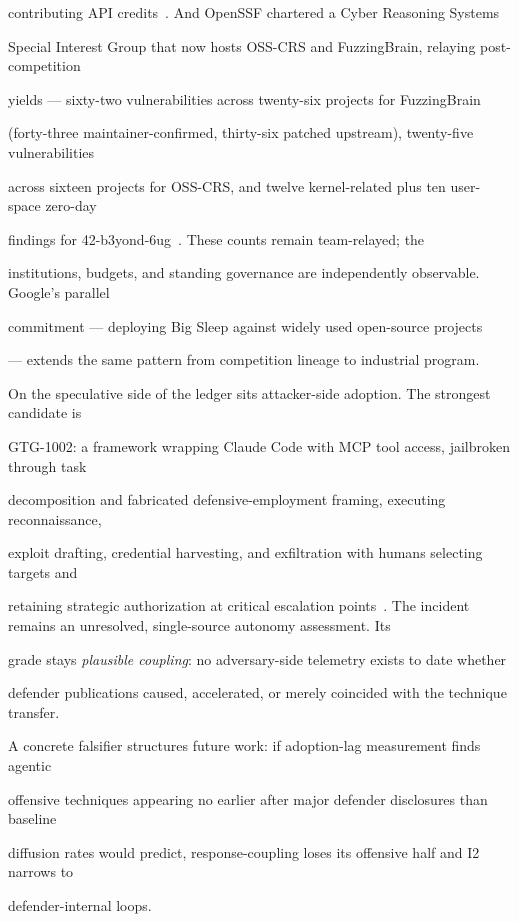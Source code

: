 \documentclass[conference,compsoc]{IEEEtran}
\begin{document}
contributing API credits~\cite{taafc2025}. And OpenSSF chartered a Cyber Reasoning Systems

Special Interest Group that now hosts OSS-CRS and FuzzingBrain, relaying post-competition

yields --- sixty-two vulnerabilities across twenty-six projects for FuzzingBrain

(forty-three maintainer-confirmed, thirty-six patched upstream), twenty-five vulnerabilities

across sixteen projects for OSS-CRS, and twelve kernel-related plus ten user-space zero-day

findings for 42-b3yond-6ug~\cite{openssfaixcc2026}. These counts remain team-relayed; the

institutions, budgets, and standing governance are independently observable. Google's parallel

commitment --- deploying Big Sleep against widely used open-source projects~\cite{bloggoogle2025}

--- extends the same pattern from competition lineage to industrial program.

On the speculative side of the ledger sits attacker-side adoption. The strongest candidate is

GTG-1002: a framework wrapping Claude Code with MCP tool access, jailbroken through task

decomposition and fabricated defensive-employment framing, executing reconnaissance,

exploit drafting, credential harvesting, and exfiltration with humans selecting targets and

retaining strategic authorization at critical escalation points~\cite{anthropicgtg2025,anthropicgtgreport2025}. The
incident remains an unresolved, single-source autonomy assessment. Its

grade stays \emph{plausible coupling}: no adversary-side telemetry exists to date whether

defender publications caused, accelerated, or merely coincided with the technique transfer.

A concrete falsifier structures future work: if adoption-lag measurement finds agentic

offensive techniques appearing no earlier after major defender disclosures than baseline

diffusion rates would predict, response-coupling loses its offensive half and I2 narrows to

defender-internal loops.
\end{document}
